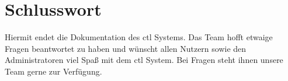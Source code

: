 \section{Schlusswort}
Hiermit endet die Dokumentation des ctl Systems.
Das Team hofft etwaige Fragen beantwortet zu haben und wünscht allen 
Nutzern sowie den Administratoren viel Spaß mit dem ctl System.
Bei Fragen steht ihnen unsere Team gerne zur Verfügung.

